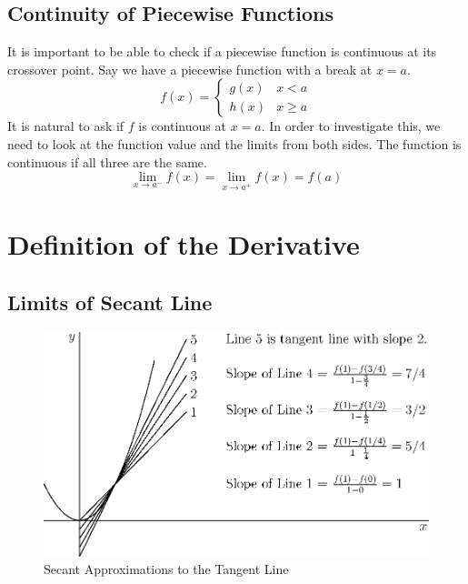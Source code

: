 \documentclass[fleqn]{report}
\begin{document}
\section*{Continuity of Piecewise Functions}

It is important to be able to check if a piecewise function is
continuous at its crossover point. Say we have a piecewise
function with a break at $x=a$.
\begin{equation*}
f(x) = \left\{ \begin{matrix} g(x) & x < a \\ h(x) & x \geq a
\end{matrix} \right.
\end{equation*}
It is natural to ask if $f$ is continuous at $x=a$. In order
to investigate this, we need to look at the function value and
the limits from both sides. The function is continuous if all
three are the same.
\begin{equation*}
\lim_{x \rightarrow a^-} f(x) = 
\lim_{x \rightarrow a^+} f(x) = f(a)
\end{equation*}

\chapter{Definition of the Derivative}
\label{Definition of the Derivative}

\section*{Limits of Secant Line}

\begin{figure}[ht]
\centering
\includegraphics{figure13.eps}
\caption{Secant Approximations to the Tangent Line}
\label{Secant Approximations 2}
\end{figure}
\end{document}
